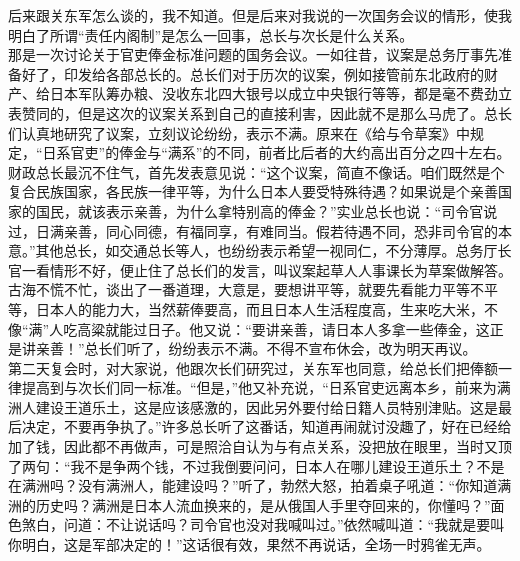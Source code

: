 后来跟关东军怎么谈的，我不知道。但是后来对我说的一次国务会议的情形，使我明白了所谓“责任内阁制”是怎么一回事，总长与次长是什么关系。\\

那是一次讨论关于官吏俸金标准问题的国务会议。一如往昔，议案是总务厅事先准备好了，印发给各部总长的。总长们对于历次的议案，例如接管前东北政府的财产、给日本军队筹办粮、没收东北四大银号以成立中央银行等等，都是毫不费劲立表赞同的，但是这次的议案关系到自己的直接利害，因此就不是那么马虎了。总长们认真地研究了议案，立刻议论纷纷，表示不满。原来在《给与令草案》中规定，“日系官吏”的俸金与“满系”的不同，前者比后者的大约高出百分之四十左右。财政总长最沉不住气，首先发表意见说：“这个议案，简直不像话。咱们既然是个复合民族国家，各民族一律平等，为什么日本人要受特殊待遇？如果说是个亲善国家的国民，就该表示亲善，为什么拿特别高的俸金？”实业总长也说：“司令官说过，日满亲善，同心同德，有福同享，有难同当。假若待遇不同，恐非司令官的本意。”其他总长，如交通总长等人，也纷纷表示希望一视同仁，不分薄厚。总务厅长官一看情形不好，便止住了总长们的发言，叫议案起草人人事课长为草案做解答。古海不慌不忙，谈出了一番道理，大意是，要想讲平等，就要先看能力平等不平等，日本人的能力大，当然薪俸要高，而且日本人生活程度高，生来吃大米，不像“满”人吃高粱就能过日子。他又说：“要讲亲善，请日本人多拿一些俸金，这正是讲亲善！”总长们听了，纷纷表示不满。不得不宣布休会，改为明天再议。\\

第二天复会时，对大家说，他跟次长们研究过，关东军也同意，给总长们把俸额一律提高到与次长们同一标准。“但是，”他又补充说，“日系官吏远离本乡，前来为满洲人建设王道乐土，这是应该感激的，因此另外要付给日籍人员特别津贴。这是最后决定，不要再争执了。”许多总长听了这番话，知道再闹就讨没趣了，好在已经给加了钱，因此都不再做声，可是照洽自认为与有点关系，没把放在眼里，当时又顶了两句：“我不是争两个钱，不过我倒要问问，日本人在哪儿建设王道乐土？不是在满洲吗？没有满洲人，能建设吗？”听了，勃然大怒，拍着桌子吼道：“你知道满洲的历史吗？满洲是日本人流血换来的，是从俄国人手里夺回来的，你懂吗？”面色煞白，问道：不让说话吗？司令官也没对我喊叫过。”依然喊叫道：“我就是要叫你明白，这是军部决定的！”这话很有效，果然不再说话，全场一时鸦雀无声。\\

